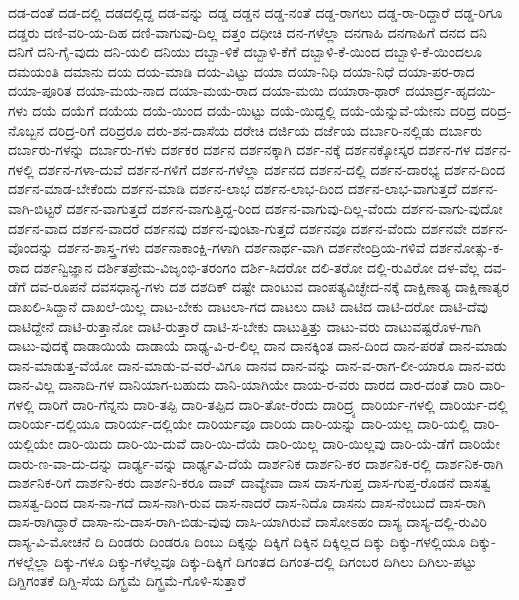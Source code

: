 {ದಡ-ದಂತೆ
ದಡ-ದಲ್ಲಿ
ದಡದಲ್ಲಿದ್ದ
ದಡ-ವನ್ನು
ದಡ್ಡ
ದಡ್ಡನ
ದಡ್ಡ-ನಂತೆ
ದಡ್ಡ-ರಾಗಲು
ದಡ್ಡ-ರಾ-ರಿದ್ದಾರೆ
ದಡ್ಡ-ರಿಗೂ
ದಡ್ಡರು
ದಣಿ-ವರಿ-ಯ-ದಿಹ
ದಣಿ-ವಾಗುವು-ದಿಲ್ಲ
ದತ್ತಂ
ದಧೀಚಿ
ದನ-ಗಳೆಲ್ಲಾ
ದನಗಾಹಿ
ದನಗಾಹಿಗೆ
ದನದ
ದನಿ
ದನಿಗೆ
ದನಿ-ಗೈ-ವುದು
ದನಿ-ಯಲಿ
ದನಿಯು
ದಬ್ಬಾ-ಳಿಕೆ
ದಬ್ಬಾಳಿ-ಕೆಗೆ
ದಬ್ಬಾಳಿ-ಕೆ-ಯಿಂದ
ದಬ್ಬಾಳಿ-ಕೆ-ಯಿಂದಲೂ
ದಮಯಂತಿ
ದಮಾನು
ದಯ
ದಯ-ಮಾಡಿ
ದಯ-ವಿಟ್ಟು
ದಯಾ
ದಯಾ-ನಿಧಿ
ದಯಾ-ನಿಧೆ
ದಯಾ-ಪರ-ರಾದ
ದಯಾ-ಪೂರಿತ
ದಯಾ-ಮಯ-ನಾದ
ದಯಾ-ಮಯ-ರಾದ
ದಯಾ-ಮಯಿ
ದಯಾರಾ-ಥಾರ್
ದಯಾರ್ದ್ರ-ಹೃದಯಿ-ಗಳು
ದಯೆ
ದಯೆಗೆ
ದಯೆಯ
ದಯೆ-ಯಿಂದ
ದಯೆ-ಯಿಟ್ಟು
ದಯೆ-ಯಿದ್ದಲ್ಲಿ
ದಯೆ-ಯೆನ್ನುವೆ-ಯೇನು
ದರಿದ್ರ
ದರಿದ್ರ-ನೊಬ್ಬನ
ದರಿದ್ರ-ರಿಗೆ
ದರಿದ್ರರೂ
ದರು-ಶನ-ದಾಸೆಯ
ದರೇಚಿ
ದರ್ಜಿಯ
ದರ್ಜೆಯ
ದರ್ಬಾರಿ-ನಲ್ಲಿಡು
ದರ್ಬಾರು
ದರ್ಬಾರು-ಗಳನ್ನು
ದರ್ಬಾರು-ಗಳು
ದರ್ಶಕರ
ದರ್ಶನ
ದರ್ಶನಕ್ಕಾಗಿ
ದರ್ಶ-ನಕ್ಕೆ
ದರ್ಶನಕ್ಕೋಸ್ಕರ
ದರ್ಶನ-ಗಳ
ದರ್ಶನ-ಗಳಲ್ಲಿ
ದರ್ಶನ-ಗಳಾ-ದುವೆ
ದರ್ಶನ-ಗಳಿಗೆ
ದರ್ಶನ-ಗಳೆಲ್ಲಾ
ದರ್ಶನದ
ದರ್ಶನ-ದಲ್ಲಿ
ದರ್ಶನ-ದಾರಭ್ಯ
ದರ್ಶನ-ದಿಂದ
ದರ್ಶನ-ಮಾಡ-ಬೇಕೆಂದು
ದರ್ಶನ-ಮಾಡಿ
ದರ್ಶನ-ಲಾಭ
ದರ್ಶನ-ಲಾಭ-ದಿಂದ
ದರ್ಶನ-ಲಾಭ-ವಾಗುತ್ತದೆ
ದರ್ಶನ-ವಾಗಿ-ಬಿಟ್ಟರೆ
ದರ್ಶನ-ವಾಗುತ್ತದೆ
ದರ್ಶನ-ವಾಗುತ್ತಿದ್ದ-ರಿಂದ
ದರ್ಶನ-ವಾಗುವು-ದಿಲ್ಲ-ವೆಂದು
ದರ್ಶನ-ವಾಗು-ವುದೋ
ದರ್ಶನ-ವಾದ
ದರ್ಶನ-ವಾದರೆ
ದರ್ಶನವು
ದರ್ಶನ-ವುಂಟಾ-ಗುತ್ತದೆ
ದರ್ಶನವೂ
ದರ್ಶನ-ವೆಂದು
ದರ್ಶನವೇ
ದರ್ಶನ-ವೊಂದನ್ನು
ದರ್ಶನ-ಶಾಸ್ತ್ರ-ಗಳು
ದರ್ಶನಾಕಾಂಕ್ಷಿ-ಗಳಾಗಿ
ದರ್ಶನಾರ್ಥ-ವಾಗಿ
ದರ್ಶನೇಂದ್ರಿಯ-ಗಳಿವೆ
ದರ್ಶನೋತ್ಸು-ಕ-ರಾದ
ದರ್ಶನ್ವಿಜ್ಞಾನ
ದರ್ಶಿತಪ್ರೇಮ-ವಿಜೃಂಭಿ-ತರಂಗಂ
ದರ್ಶಿ-ಸಿದರೋ
ದಲಿ-ತರೋ
ದಲ್ಲಿ-ರುವಿರೋ
ದಳ-ವೆಲ್ಲ
ದವ-ಡೆಗೆ
ದವ-ರೂಪನೆ
ದವಸಧಾನ್ಯ-ಗಳು
ದಶ
ದಶದಿಕ್
ದಷ್ಟೇ
ದಾಂಟುವ
ದಾಂಪತ್ಯವಿಚ್ಛೇದ-ನಕ್ಕೆ
ದಾಕ್ಷಿಣಾತ್ಯ
ದಾಕ್ಷಿಣಾತ್ಯರ
ದಾಖಲಿ-ಸಿದ್ದಾನೆ
ದಾಖಲೆ-ಯಿಲ್ಲ
ದಾಟ-ಬೇಕು
ದಾಟಲಾ-ಗದ
ದಾಟಲು
ದಾಟಿ
ದಾಟಿದ
ದಾಟಿ-ದರೋ
ದಾಟಿ-ದೆವು
ದಾಟಿದ್ದೇನೆ
ದಾಟಿ-ರುತ್ತಾನೋ
ದಾಟಿ-ರುತ್ತಾರೆ
ದಾಟಿ-ಸ-ಬೇಕು
ದಾಟುತ್ತಿತ್ತು
ದಾಟು-ವರು
ದಾಟುವಷ್ಟರೊಳ-ಗಾಗಿ
ದಾಟು-ವುದಕ್ಕೆ
ದಾಡಾಯಿಯೆ
ದಾಡಾಯೆ
ದಾಢ್ಯ-ವಿ-ರ-ಲಿಲ್ಲ
ದಾನ
ದಾನಕ್ಕಿಂತ
ದಾನ-ದಿಂದ
ದಾನ-ಪರತೆ
ದಾನ-ಮಾಡು
ದಾನ-ಮಾಡುತ್ತ-ವೆಯೋ
ದಾನ-ಮಾಡು-ವ-ವರೆ-ವಿಗೂ
ದಾನವ
ದಾನ-ವನ್ನು
ದಾನ-ವ-ರಾಗ-ಲೀ-ಯಾರೂ
ದಾನ-ವರು
ದಾನ-ವಿಲ್ಲ
ದಾನಾದಿ-ಗಳ
ದಾನಿಯಾಗ-ಬಹುದು
ದಾನಿ-ಯಾಗಿಯೇ
ದಾಯ-ರ-ವರು
ದಾರದ
ದಾರ-ದಂತೆ
ದಾರಿ
ದಾರಿ-ಗಳಲ್ಲಿ
ದಾರಿಗೆ
ದಾರಿ-ಗೆನ್ನನು
ದಾರಿ-ತಪ್ಪಿ
ದಾರಿ-ತಪ್ಪಿದ
ದಾರಿ-ತೋ-ರೆಂದು
ದಾರಿದ್ರ್ಯ
ದಾರಿರ್ಯ-ಗಳಲ್ಲಿ
ದಾರಿರ್ಯ-ದಲ್ಲಿ
ದಾರಿರ್ಯ-ದಲ್ಲಿಯೂ
ದಾರಿರ್ಯ-ದಲ್ಲಿಯೇ
ದಾರಿರ್ಯವೂ
ದಾರಿಯ
ದಾರಿ-ಯನ್ನು
ದಾರಿ-ಯಲ್ಲ
ದಾರಿ-ಯಲ್ಲಿ
ದಾರಿ-ಯಲ್ಲಿಯೇ
ದಾರಿ-ಯಿದು
ದಾರಿ-ಯಿ-ದುವೆ
ದಾರಿ-ಯಿ-ದೆಯೆ
ದಾರಿ-ಯಿಲ್ಲ
ದಾರಿ-ಯಿಲ್ಲವು
ದಾರಿ-ಯೆ-ಡೆಗೆ
ದಾರಿಯೇ
ದಾರು-ಣ-ವಾ-ದು-ದನ್ನು
ದಾರ್ಢ್ಯ-ವನ್ನು
ದಾರ್ಢ್ಯವಿ-ದೆಯೆ
ದಾರ್ಶನಿಕ
ದಾರ್ಶನಿ-ಕರ
ದಾರ್ಶನಿಕ-ರಲ್ಲಿ
ದಾರ್ಶನಿಕ-ರಾಗಿ
ದಾರ್ಶನಿಕ-ರಿಗೆ
ದಾರ್ಶನಿ-ಕರು
ದಾರ್ಶನಿ-ಕರೂ
ದಾವ್
ದಾವ್ಯೇವಾ
ದಾಸ
ದಾಸ-ಗುಪ್ತ
ದಾಸ-ಗುಪ್ತ-ರೊಡನೆ
ದಾಸತ್ವ
ದಾಸತ್ವ-ದಿಂದ
ದಾಸ-ನಾ-ಗದೆ
ದಾಸ-ನಾಗಿ-ರುವ
ದಾಸ-ನಾದರೆ
ದಾಸ-ನಿದೊ
ದಾಸನು
ದಾಸ-ನೆಂಬುದೆ
ದಾಸ-ರಾಗಿ
ದಾಸ-ರಾಗಿದ್ದಾರೆ
ದಾಸಾ-ನು-ದಾಸ-ರಾಗಿ-ಬಿಡು-ವುವು
ದಾಸಿ-ಯಾಗಿರುವೆ
ದಾಸೋಽಹಂ
ದಾಸ್ಯ
ದಾಸ್ಯ-ದಲ್ಲಿ-ರುವಿರಿ
ದಾಸ್ಯ-ವಿ-ಮೋಚನೆ
ದಿ
ದಿಂಡರು
ದಿಂಡರೂ
ದಿಂಬು
ದಿಕ್ಕನ್ನು
ದಿಕ್ಕಿಗೆ
ದಿಕ್ಕಿನ
ದಿಕ್ಕಿಲ್ಲದ
ದಿಕ್ಕು
ದಿಕ್ಕು-ಗಳಲ್ಲಿಯೂ
ದಿಕ್ಕು-ಗಳಲ್ಲೆಲ್ಲಾ
ದಿಕ್ಕು-ಗಳೂ
ದಿಕ್ಕು-ಗಳೆಲ್ಲವೂ
ದಿಕ್ಕು-ದಿಕ್ಕಿಗೆ
ದಿಗಂತದ
ದಿಗಂತ-ದಲ್ಲಿ
ದಿಗಂಬರ
ದಿಗಿಲು
ದಿಗಿಲು-ಪಟ್ಟು
ದಿಗ್ದಿಗಂತಕೆ
ದಿಗ್ದಿ-ಸೆಯ
ದಿಗ್ಭ್ರಮೆ
ದಿಗ್ಭ್ರಮೆ-ಗೊಳಿ-ಸುತ್ತಾರೆ
}
